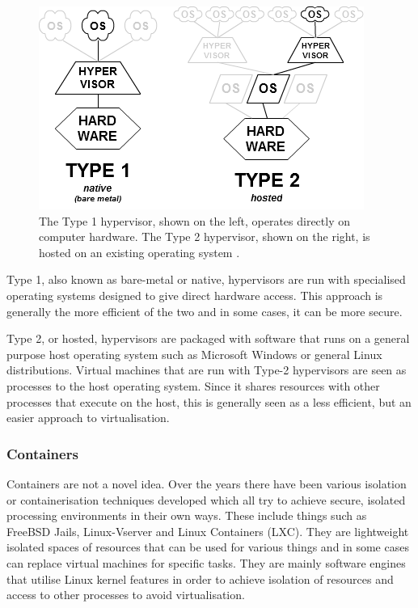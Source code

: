 \begin{figure}[ht!]
\centering
\includegraphics{Figures/hypervisor_difference.png}
\decoRule
\caption[Differences between Type 1 and Type 2 Hypervisors]{The Type 1 hypervisor, shown on the left, operates directly on computer hardware. The Type 2 hypervisor, shown on the right, is hosted on an existing operating system \parencite{Wikipedia_hypervisors}.}
\label{fig:Hypervisors}
\end{figure}

Type 1, also known as bare-metal or native, hypervisors are run with specialised operating systems designed to give direct hardware access. This approach is generally the more efficient of the two and in some cases, it can be more secure.

Type 2, or hosted, hypervisors are packaged with software that runs on a general purpose host operating system such as Microsoft Windows or general Linux distributions. Virtual machines that are run with Type-2 hypervisors are seen as processes to the host operating system. Since it shares resources with other processes that execute on the host, this is generally seen as a less efficient, but an easier approach to virtualisation.

\subsubsection{Containers}

Containers are not a novel idea. Over the years there have been various isolation or containerisation techniques developed which all try to achieve secure, isolated processing environments in their own ways. These include things such as FreeBSD Jails, Linux-Vserver and Linux Containers (LXC). They are lightweight isolated spaces of resources that can be used for various things and in some cases can replace virtual machines for specific tasks. They are mainly software engines that utilise Linux kernel features in order to achieve isolation of resources and access to other processes to avoid virtualisation.

